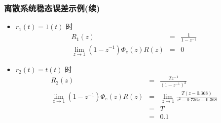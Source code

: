 \documentclass[table]{beamer}
\begin{document}
\begin{frame}
\frametitle{离散系统稳态误差示例(续)}
\label{sec-6-1-3}
\begin{itemize}

\item $r_1(t) =  1(t)$ 时\\
\label{sec-6-1-3-1}%
\begin{eqnarray*}
      R_1(z) &=& \frac{1}{1-z^{-1}} \\
      \lim_{z\rightarrow 1}(1-z^{-1})\Phi_e(z)R(z) &=& 0
      \end{eqnarray*}

\item $r_2(t) = t(t)$ 时\\
\label{sec-6-1-3-2}%
\begin{eqnarray*}
      R_2(z) &=& \frac{Tz^{-1}}{(1-z^{-1})^2} \\
      \lim_{z\rightarrow 1}(1-z^{-1})\Phi_e(z)R(z) &=& \lim_{z\rightarrow 1}\frac{T(z-0.368)}{z^2-0.736z+0.368}\\
       &=& T \\
       &=& 0.1
      \end{eqnarray*}
\end{itemize} %
\end{frame}
\end{document}
